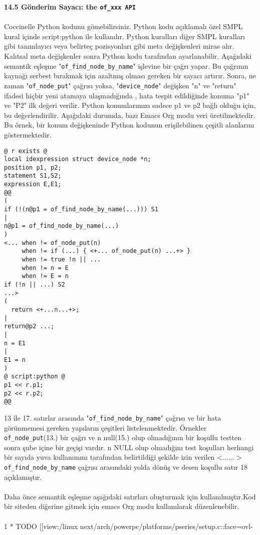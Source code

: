 \documentclass[22]{article}
\begin{document}
\textbf{14.5 Gönderim Sayacı: the \texttt{of\_xxx API}}\\
\\
Coccinelle Python kodunu gömebilirsiniz. Python kodu açıklamalı özel SMPL kural içinde script:python ile kullanılır. Python kuralları diğer SMPL kuralları gibi tanımlayıcı veya belirteç pozisyonları gibi meta değişkenleri miras alır. Kalıtsal meta değişkenler sonra Python kodu tarafından ayarlanabilir. Aşağıdaki semantik eşleşme "\texttt{of\_find\_node\_by\_name}" işlevine bir çağrı yapar. Bu çağrının kaynağı serbest bırakmak için azaltmış olması gereken bir sayacı artırır. 
Sonra, ne zaman "\texttt{of\_node\_put}" çağrısı yoksa, "\texttt{device\_node}" değişken "n" ve "return" ifadesi hiçbir yeni atamaya ulaşmadığında , hata tespit edildiğinde konuma "p1" ve "P2" ilk değeri verilir. Python konumlarımızı sadece  p1 ve p2 bağlı olduğu için, bu değerlendirilir. Aşağıdaki durumda, bazı Emacs Org modu veri üretilmektedir. Bu örnek, bir konum değişkeninde Python kodunun erişilebilinen çeşitli alanlarını göstermektedir.
\begin{lstlisting}
@ r exists @
local idexpression struct device_node *n; 
position p1, p2; 
statement S1,S2;
expression E,E1;
@@
(
if (!(n@p1 = of_find_node_by_name(...))) S1
|
n@p1 = of_find_node_by_name(...)
)
<... when != of_node_put(n)
     when != if (...) { <+... of_node_put(n) ...+> }
     when != true !n || ... 
     when != n = E 
     when != E = n 
if (!n || ...) S2
...>
(
  return <+...n...+>;
|
return@p2 ...;
|
n = E1
|
E1 = n 
)
@ script:python @
p1 << r.p1;
p2 << r.p2;
@@
\end{lstlisting}
13 ile 17. satırlar arasında "\texttt{of\_find\_node\_by\_name}" çağrısı ve bir hata görünmemesi gereken yapıların çeşitleri listelenmektedir. Örnekler \texttt{of\_node\_put}(13.) bir çağrı ve n null(15.) olup olmadığının bir koşullu testten sonra şube içine bir geçişi vardır. n NULL olup olmadığını test koşulları herhangi bir sayıda yuva kullanımını tarafından belirtildiği şekilde izin verilen <...... > \texttt{of\_find\_node\_by\_name} çağrısı arasındaki yolda dönüş ve desen koşullu satır 18 açıklamıştır.\\
\\
Daha önce semantik eşleşme aşağıdaki satırları oluşturmak için kullanılmıştır.Kod bir siteden diğerine gitmek için emacs Org modu kullanılarak düzenlenebilir.\\
\\
1 * TODO [[view:/linux next/arch/powerpc/platforms/pseries/setup.c::face=ovl-
      \tab\tab{face1::linb=236::colb=18::cole=20][inc. counter:/linux-next/arch/powerpc/}
\end{document}
